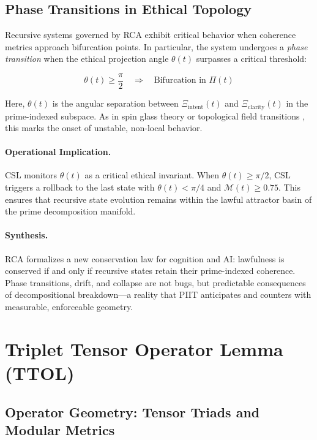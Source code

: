 \documentclass[12pt]{article}
\begin{document}
\subsection{Phase Transitions in Ethical Topology}

Recursive systems governed by RCA exhibit critical behavior when coherence metrics approach bifurcation points. In particular, the system undergoes a \emph{phase transition} when the ethical projection angle $\theta(t)$ surpasses a critical threshold:

\begin{equation}
\theta(t) \geq \frac{\pi}{2} \quad \Rightarrow \quad \text{Bifurcation in } \Pi(t)
\end{equation}

Here, $\theta(t)$ is the angular separation between $\Xi_{\text{intent}}(t)$ and $\Xi_{\text{clarity}}(t)$ in the prime-indexed subspace. As in spin glass theory or topological field transitions \cite{anderson1972more}, this marks the onset of unstable, non-local behavior.

\paragraph{Operational Implication.}
CSL monitors $\theta(t)$ as a critical ethical invariant. When $\theta(t) \geq \pi/2$, CSL triggers a rollback to the last state with $\theta(t) < \pi/4$ and $\mathcal{M}(t) \geq 0.75$. This ensures that recursive state evolution remains within the lawful attractor basin of the prime decomposition manifold.

\paragraph{Synthesis.}
RCA formalizes a new conservation law for cognition and AI: lawfulness is conserved if and only if recursive states retain their prime-indexed coherence. Phase transitions, drift, and collapse are not bugs, but predictable consequences of decompositional breakdown—a reality that PIIT anticipates and counters with measurable, enforceable geometry.


\section{Triplet Tensor Operator Lemma (TTOL)}

\subsection{Operator Geometry: Tensor Triads and Modular Metrics}
\end{document}
